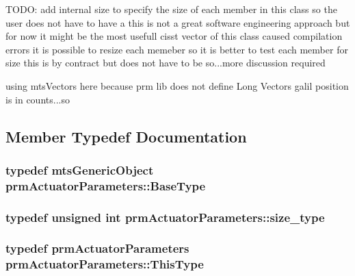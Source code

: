 T\+O\+D\+O\+: add internal size to specify the size of each member in this class so the user does not have to have a this is not a great software engineering approach but for now it might be the most usefull cisst vector of this class caused compilation errors it is possible to resize each memeber so it is better to test each member for size this is by contract but does not have to be so...more discussion required

using mts\+Vectors here because prm lib does not define Long Vectors galil position is in counts...so 

\subsection{Member Typedef Documentation}
\hypertarget{classprm_actuator_parameters_a9e63e124dcab41543b0bdcd0a652671b}{}
\subsubsection[{Base\+Type}]{\setlength{\rightskip}{0pt plus 5cm}typedef {\bf mts\+Generic\+Object} {\bf prm\+Actuator\+Parameters\+::\+Base\+Type}}\label{classprm_actuator_parameters_a9e63e124dcab41543b0bdcd0a652671b}
\hypertarget{classprm_actuator_parameters_a0b8bdcb6c28e1f3028d93cf9b6ca1ee0}{}
\subsubsection[{size\+\_\+type}]{\setlength{\rightskip}{0pt plus 5cm}typedef unsigned int {\bf prm\+Actuator\+Parameters\+::size\+\_\+type}}\label{classprm_actuator_parameters_a0b8bdcb6c28e1f3028d93cf9b6ca1ee0}
\hypertarget{classprm_actuator_parameters_a589f0647003ec5c96825d45d645baa49}{}
\subsubsection[{This\+Type}]{\setlength{\rightskip}{0pt plus 5cm}typedef {\bf prm\+Actuator\+Parameters} {\bf prm\+Actuator\+Parameters\+::\+This\+Type}}\label{classprm_actuator_parameters_a589f0647003ec5c96825d45d645baa49}


